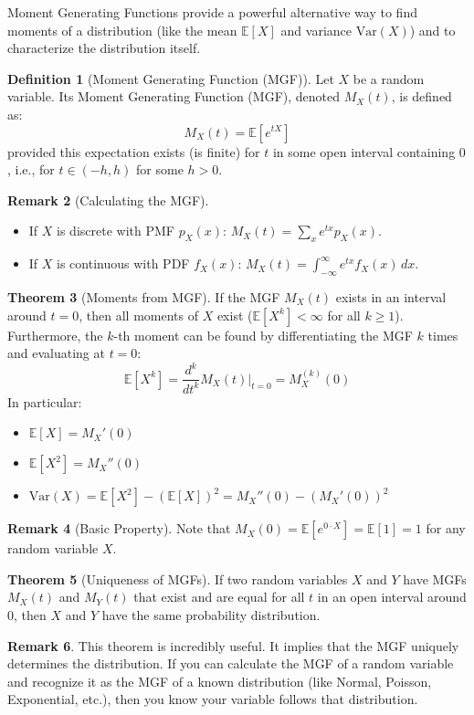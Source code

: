 \documentclass[11pt]{article}
\theoremstyle{definition}
\newtheorem{definition}{Definition}[section]
\newtheorem{theorem}[definition]{Theorem}
\newtheorem{remark}[definition]{Remark}
\newcommand{\E}{\mathbb{E}} %
\newcommand{\Var}{\mathrm{Var}} %
\begin{document}
Moment Generating Functions provide a powerful alternative way to find moments of a distribution (like the mean $\E[X]$ and variance $\Var(X)$) and to characterize the distribution itself.

\begin{definition}[Moment Generating Function (MGF)]
Let $X$ be a random variable. Its Moment Generating Function (MGF), denoted $M_X(t)$, is defined as:
\[ M_X(t) = \E[e^{tX}] \]
provided this expectation exists (is finite) for $t$ in some open interval containing $0$, i.e., for $t \in (-h, h)$ for some $h > 0$.
\end{definition}

\begin{remark}[Calculating the MGF]
\begin{itemize}
    \item If $X$ is discrete with PMF $p_X(x)$: $M_X(t) = \sum_x e^{tx} p_X(x)$.
    \item If $X$ is continuous with PDF $f_X(x)$: $M_X(t) = \int_{-\infty}^{\infty} e^{tx} f_X(x) \, dx$.
\end{itemize}
\end{remark}

\begin{theorem}[Moments from MGF]
If the MGF $M_X(t)$ exists in an interval around $t=0$, then all moments of $X$ exist ($\E[X^k] < \infty$ for all $k \ge 1$). Furthermore, the $k$-th moment can be found by differentiating the MGF $k$ times and evaluating at $t=0$:
\[ \E[X^k] = \frac{d^k}{dt^k} M_X(t) \bigg|_{t=0} = M_X^{(k)}(0) \]
In particular:
\begin{itemize}
    \item $\E[X] = M_X'(0)$
    \item $\E[X^2] = M_X''(0)$
    \item $\Var(X) = \E[X^2] - (\E[X])^2 = M_X''(0) - (M_X'(0))^2$
\end{itemize}
\end{theorem}

\begin{remark}[Basic Property]
Note that $M_X(0) = \E[e^{0 \cdot X}] = \E[1] = 1$ for any random variable $X$.
\end{remark}

\begin{theorem}[Uniqueness of MGFs]
If two random variables $X$ and $Y$ have MGFs $M_X(t)$ and $M_Y(t)$ that exist and are equal for all $t$ in an open interval around $0$, then $X$ and $Y$ have the same probability distribution.
\end{theorem}
\begin{remark}
This theorem is incredibly useful. It implies that the MGF uniquely determines the distribution. If you can calculate the MGF of a random variable and recognize it as the MGF of a known distribution (like Normal, Poisson, Exponential, etc.), then you know your variable follows that distribution.
\end{remark}
\end{document}
